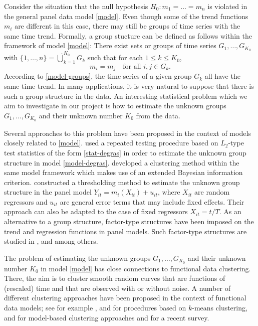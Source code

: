 \documentclass[a4paper,12pt]{article}
\begin{document}
\noindent Consider the situation that the null hypothesis $H_0: m_1 = \ldots = m_n$ is violated in the general panel data model \eqref{model}. Even though some of the trend functions $m_i$ are different in this case, there may still be groups of time series with the same time trend. Formally, a group stucture can be defined as follows within the framework of model \eqref{model}: There exist sets or groups of time series $G_1,\ldots,G_{K_0}$ with $\{1,\ldots,n\} = \dot\bigcup_{k=1}^{K_0} G_k$ such that for each $1 \le k \le K_0$, 
\begin{equation}\label{model-groups}
m_i = m_j \quad \text{for all } i,j \in G_k. 
\end{equation}
According to \eqref{model-groups}, the time series of a given group $G_k$ all have the same time trend. In many applications, it is very natural to suppose that there is such a group structure in the data. An interesting statistical problem which we aim to investigate in our project is how to estimate the unknown groups $G_1,\ldots,G_{K_0}$ and their unknown number $K_0$ from the data. 


Several approaches to this problem have been proposed in the context of models closely related to \eqref{model}. \cite{DegrasWu2012} used a repeated testing procedure based on $L_2$-type test statistics of the form \eqref{stat-degras} in order to estimate the unknown group structure in model \eqref{model-degras}. \cite{Zhang2013} developed a clustering method within the same model framework which makes use of an extended Bayesian information criterion. \cite{VogtLinton2017} constructed a thresholding method to estimate the unknown group structure in the panel model $Y_{it} = m_i(X_{it}) + u_{it}$, where $X_{it}$ are random regressors and $u_{it}$ are general error terms that may include fixed effects. Their approach can also be adapted to the case of fixed regressors $X_{it} = t/T$.  As an alternative to a group structure, factor-type structures have been imposed on the trend and regression functions in panel models. Such factor-type structures are studied in \cite{Kneip2012}, \cite{LintonVogt2015} and \cite{BonevaLintonVogt2016} among others. 


The problem of estimating the unknown groups $G_1,\ldots,G_{K_0}$ and their unknown number $K_0$ in model \eqref{model} has close connections to functional data clustering. There, the aim is to cluster smooth random curves that are functions of (rescaled) time and that are observed with or without noise. A number of different clustering approaches have been proposed in the context of functional data models; see for example \cite{Abraham2003}, \cite{Tarpey2003} and \cite{Tarpey2007} for procedures based on $k$-means clustering, \cite{James2003} and \cite{Chiou2007} for model-based clustering approaches and \cite{Jacques2014} for a recent survey. 
\end{document}
